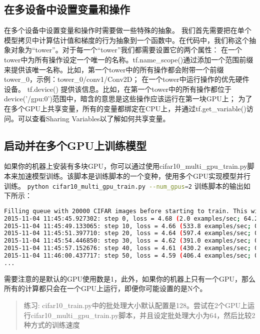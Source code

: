 \subsection{在多设备中设置变量和操作}
在多个设备中设置变量和操作时需要做一些特殊的抽象。
我们首先需要把在单个模型拷贝中计算估计值和梯度的行为抽象到一个函数中。在代码中，我们称这个抽象对象为“tower”。对于每一个“tower”我们都需要设置它的两个属性：
在一个tower中为所有操作设定一个唯一的名称。tf.name\_scope()通过添加一个范围前缀来提供该唯一名称。比如，第一个tower中的所有操作都会附带一个前缀tower\_0，示例：tower\_0/conv1/Conv2D；
在一个tower中运行操作的优先硬件设备。 tf.device() 提供该信息。比如，在第一个tower中的所有操作都位于 device('/gpu:0')范围中，暗含的意思是这些操作应该运行在第一块GPU上；
为了在多个GPU上共享变量，所有的变量都绑定在CPU上，并通过tf.get\_variable()访问。可以查看Sharing Variables以了解如何共享变量。

\subsection{启动并在多个GPU上训练模型}
如果你的机器上安装有多块GPU，你可以通过使用cifar10\_multi\_gpu\_train.py脚本来加速模型训练。该脚本是训练脚本的一个变种，使用多个GPU实现模型并行训练。
\lstinline[language=Bash]{python cifar10_multi_gpu_train.py --num_gpus=2}
训练脚本的输出如下所示：

\begin{lstlisting}[language=Bash]
Filling queue with 20000 CIFAR images before starting to train. This will take a few minutes.
2015-11-04 11:45:45.927302: step 0, loss = 4.68 (2.0 examples/sec; 64.221 sec/batch)
2015-11-04 11:45:49.133065: step 10, loss = 4.66 (533.8 examples/sec; 0.240 sec/batch)
2015-11-04 11:45:51.397710: step 20, loss = 4.64 (597.4 examples/sec; 0.214 sec/batch)
2015-11-04 11:45:54.446850: step 30, loss = 4.62 (391.0 examples/sec; 0.327 sec/batch)
2015-11-04 11:45:57.152676: step 40, loss = 4.61 (430.2 examples/sec; 0.298 sec/batch)
2015-11-04 11:46:00.437717: step 50, loss = 4.59 (406.4 examples/sec; 0.315 sec/batch)
...
\end{lstlisting}

需要注意的是默认的GPU使用数是1，此外，如果你的机器上只有一个GPU，那么所有的计算都只会在一个GPU上运行，即便你可能设置的是N个。

\begin{quote}
练习: cifar10\_train.py中的批处理大小默认配置是128。尝试在2个GPU上运行cifar10\_multi\_gpu\_train.py脚本，并且设定批处理大小为64，然后比较2种方式的训练速度
\end{quote}

